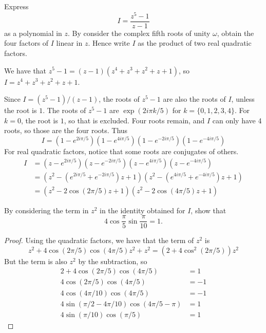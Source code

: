 \documentclass[12pt]{article}
\begin{document}
    \begin{question}
        Express
        \[
            I = \frac{z^{5}-1}{z-1}
        \]
        as a polynomial in $z$.
        By consider the complex fifth roots of unity $\omega$,
        obtain the four factors of $I$ linear in $z$.
        Hence write $I$ as the product of two real quadratic factors.
    \end{question}
    \begin{answer}
        We have that $z^{5}-1 = (z-1)(z^{4}+z^{3}+z^{2}+z+1)$,
        so $I = z^{4}+z^{3}+z^{2}+z+1$.

        Since $I = (z^{5}-1)/(z-1)$, the roots of $z^{5}-1$
        are also the roots of $I$, unless the root is $1$.
        The roots of $z^{5}-1$ are $\exp(2i\pi k/5)$ for $k=\{0,1,2,3,4\}$.
        For $k=0$, the root is $1$, so that is excluded.
        Four roots remain, and $I$ can only have 4 roots,
        so those are the four roots. Thus
        \[
        I = (1 - e^{2i\pi/5})(1 - e^{4i\pi/5})(1 - e^{-2i\pi/5})(1 - e^{-4i\pi/5})
        \]
        For real quadratic factors, notice that some roots are conjugates of others.
        \begin{align*}
            I 
            &= (z - e^{2i\pi/5})(z - e^{-2i\pi/5})(z - e^{4i\pi/5})(z - e^{-4i\pi/5})\\
            &= (z^{2} - (e^{2i\pi/5} + e^{-2i\pi/5})z + 1)(z^{2} - (e^{4i\pi/5} + e^{-4i\pi/5})z + 1)\\
            &= (z^{2} - 2\cos(2\pi/5)z + 1)(z^{2} - 2\cos(4\pi/5)z + 1)
        \end{align*}
    \end{answer}

    \begin{subquestion}
        By considering the term in $z^{2}$ in the identity
        obtained for $I$, show that
        \[
        4\cos\frac{\pi}{5}\sin\frac{\pi}{10}=1.
        \]
    \end{subquestion}
    \begin{proof}
        Using the quadratic factors, we have that
        the term of $z^{2}$ is
        \[
            z^{2} + 4\cos(2\pi/5)\cos(4\pi/5)z^{2} + z^{2} = (2 + 4\cos^{2}(2\pi/5))z^{2}
        \]
        But the term is also $z^{2}$ by the subtraction, so
        \begin{align*}
            2 + 4\cos(2\pi/5)\cos(4\pi/5) &= 1\\
            4\cos(2\pi/5)\cos(4\pi/5) &= -1\\
            4\cos(4\pi/10)\cos(4\pi/5) &= -1\\
            4\sin(\pi/2 - 4\pi/10)\cos(4\pi/5 - \pi) &= 1\\
            4\sin(\pi/10)\cos(\pi/5) &= 1
        \end{align*}
    \end{proof}
\end{document}

